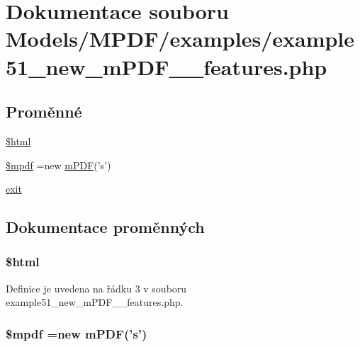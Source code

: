 \hypertarget{example51__new__m_p_d_f__4__features_8php}{\section{Dokumentace souboru Models/\-M\-P\-D\-F/examples/example51\-\_\-new\-\_\-m\-P\-D\-F\-\_\-\_\-features.php}
\label{example51__new__m_p_d_f__4__features_8php}
}
\subsection*{Proměnné}
\begin{DoxyCompactItemize}
\item 
\hyperlink{example51__new__m_p_d_f__4__features_8php_a6f96e7fc92441776c9d1cd3386663b40}{\$html}
\item 
\hyperlink{example51__new__m_p_d_f__4__features_8php_ad028f81910d6cbab9b184d2214b3a8f8}{\$mpdf} =new \hyperlink{classm_p_d_f}{m\-P\-D\-F}('s')
\item 
\hyperlink{example51__new__m_p_d_f__4__features_8php_a6733eb5f605d09eaede9845835d71c4e}{exit}
\end{DoxyCompactItemize}


\subsection{Dokumentace proměnných}
\hypertarget{example51__new__m_p_d_f__4__features_8php_a6f96e7fc92441776c9d1cd3386663b40}{
\subsubsection[{\$html}]{\setlength{\rightskip}{0pt plus 5cm}\$html}}\label{example51__new__m_p_d_f__4__features_8php_a6f96e7fc92441776c9d1cd3386663b40}


Definice je uvedena na řádku 3 v souboru example51\-\_\-new\-\_\-m\-P\-D\-F\-\_\-\_\-features.\-php.

\hypertarget{example51__new__m_p_d_f__4__features_8php_ad028f81910d6cbab9b184d2214b3a8f8}{
\subsubsection[{\$mpdf}]{\setlength{\rightskip}{0pt plus 5cm}\$mpdf =new {\bf m\-P\-D\-F}('s')}}\label{example51__new__m_p_d_f__4__features_8php_ad028f81910d6cbab9b184d2214b3a8f8}


